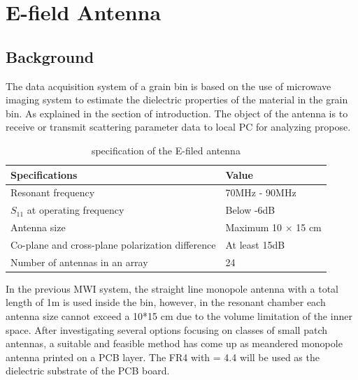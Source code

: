 
\chapter{E-field Antenna}
\label{sec:E-field Antenna}

\section{Background}

The data acquisition system of a grain bin is based on the use of microwave imaging system to estimate the dielectric properties of the material in the grain bin. As explained in the section of introduction. The object of the antenna is to receive or transmit scattering parameter data to local PC for analyzing propose.

\begin{table}[h]
\centering
\caption{specification of the E-filed antenna}
\label{efield antenna specs}
\begin{tabular}{|l|l|}
\hline
Specifications                                   & Value              \\ \hline
Resonant frequency                               & 70MHz - 90MHz      \\ \hline
$S_{11}$ at operating frequency                       & Below -6dB         \\ \hline
Antenna size                                     & Maximum 10 $\times$ 15 cm \\ \hline
Co-plane and cross-plane polarization difference & At least 15dB      \\ \hline
Number of antennas in an array                   & 24                 \\ \hline
\end{tabular}
\end{table}

In the previous MWI system, the straight line monopole antenna with a total length of 1m is used inside the bin, however, in the resonant chamber each antenna size cannot exceed a 10*15 cm due to the volume limitation of the inner space. After investigating several options focusing on classes of small patch antennas, a suitable and feasible method has come up as meandered monopole antenna printed on a PCB layer. The FR4 with  = 4.4 will be used as the dielectric substrate of the PCB board.

